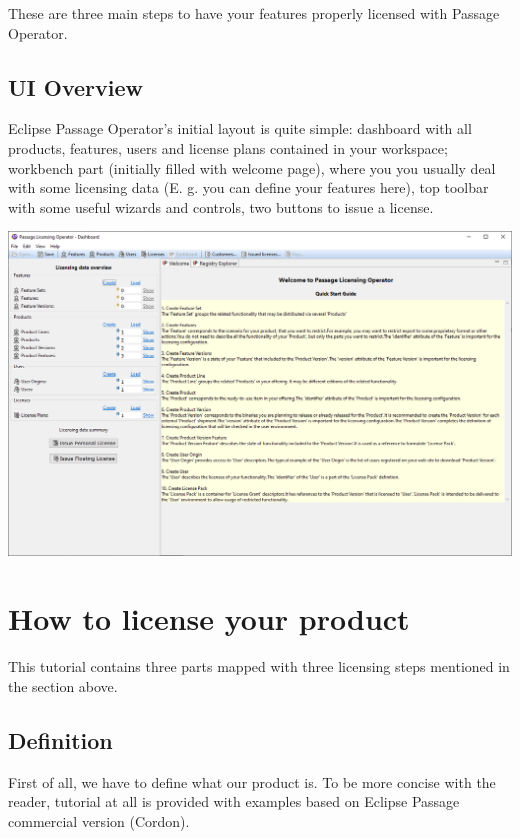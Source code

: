\documentclass[12pt]{report}
\begin{document}
These are three main steps to have your features properly licensed with Passage Operator.

\subsection*{UI Overview}

Eclipse Passage Operator's initial layout is quite simple: dashboard with all products, features, users and license plans contained in your workspace; workbench part (initially filled with welcome page),
where you you usually deal with some licensing data (E. g. you can define your features here), top toolbar with some useful wizards and controls, two buttons to issue a license.

\begin{center}
    \includegraphics[width=\textwidth]{ui}
\end{center}

\section*{How to license your product}

This tutorial contains three parts mapped with three licensing steps mentioned in the section above.

\subsection*{Definition}

First of all, we have to define what our product is. To be more concise with the reader, tutorial at all is provided with examples based on Eclipse Passage commercial version (Cordon).
\end{document}
